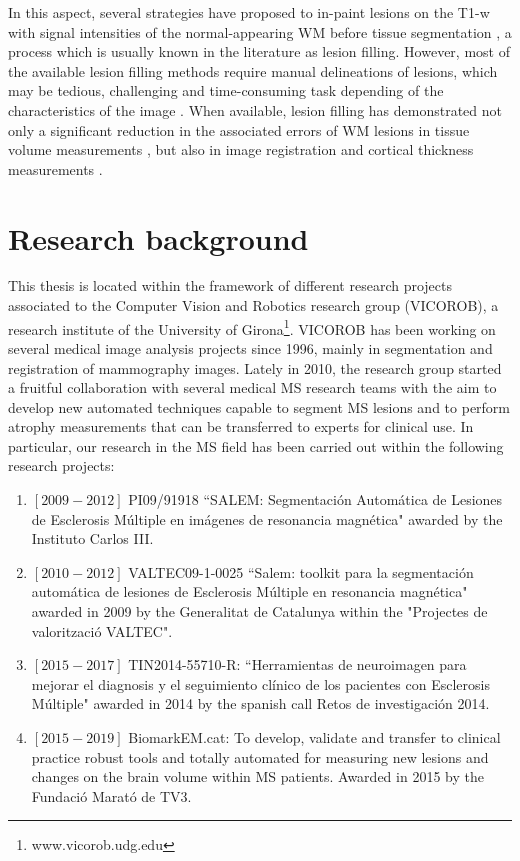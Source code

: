In this aspect, several strategies have proposed to in-paint lesions on the T1-w with signal intensities of the normal-appearing WM before tissue segmentation \cite{Battaglini2012, Chard2010, Magon2014, Sdika2009}, a process which is usually known in the literature as lesion filling. However, most of the available lesion filling methods require manual delineations of lesions, which may be tedious, challenging and time-consuming task depending of the characteristics of the image \cite{Llado2012}. When available, lesion filling has demonstrated not only a significant reduction in the associated errors of WM lesions in tissue volume measurements \cite{Popescu2014}, but also in image registration \cite{Ceccarelli2012,  Diez2014, Sdika2009} and cortical thickness measurements \cite{Magon2014}. 

\section{Research background}
\label{sec:research_background}

This thesis is located within the framework of different research projects associated to the Computer Vision and Robotics research group (VICOROB), a research institute of the University of Girona\footnote{www.vicorob.udg.edu}. VICOROB has been working on several medical image analysis projects since 1996, mainly in segmentation and registration of mammography images. Lately in 2010, the research group started a fruitful collaboration with several medical MS research teams with the aim to develop new automated techniques capable to segment MS lesions and to perform atrophy measurements that can be transferred to experts for clinical use. In particular, our research in the MS field has been carried out within the following research projects:

\begin{enumerate}

\item $[2009-2012]$ PI09/91918 ``SALEM: Segmentaci\'{o}n Autom\'{a}tica de Lesiones de Esclerosis M\'{u}ltiple en im\'{a}genes de resonancia magn\'{e}tica" awarded by the Instituto Carlos III. 

\item $[2010-2012]$ VALTEC09-1-0025 ``Salem: toolkit para la segmentaci\'{o}n autom\'{a}tica de lesiones de Esclerosis M\'{u}ltiple en resonancia magn\'{e}tica" awarded in 2009 by the Generalitat de Catalunya within the "Projectes de valoritzaci\'{o} VALTEC".

\item $[2015-2017]$ TIN2014-55710-R: ``Herramientas de neuroimagen para mejorar el diagnosis y el seguimiento cl\'{i}nico de los pacientes con Esclerosis M\'{u}ltiple" awarded in 2014 by the spanish call Retos de investigaci\'{o}n 2014.

\item $[2015-2019]$ BiomarkEM.cat: To develop, validate and transfer to clinical practice robust tools and totally automated for measuring new lesions and changes on the brain volume within MS patients. Awarded in 2015 by the Fundaci\'{o} Marat\'{o} de TV3.

\end{enumerate}

